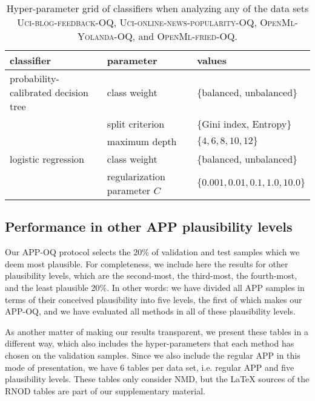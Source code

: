 \documentclass[10pt,a4paper]{article}
\begin{document}
\begin{table}
  \centering
  \caption{Hyper-parameter grid of classifiers when analyzing any of the data sets \textsc{Uci-blog-feedback-OQ}, \textsc{Uci-online-news-popularity-OQ}, \textsc{OpenMl-Yolanda-OQ}, and \textsc{OpenMl-fried-OQ}.}
  \label{tab:hyperparameter-others}
  \footnotesize
  \begin{tabular}{lll}
    \toprule
    classifier & parameter & values \\
    \midrule
    probability-calibrated decision tree & class weight & \{balanced, unbalanced\} \\
    & split criterion & \{Gini index, Entropy\} \\
    & maximum depth & $\{4, 6, 8, 10, 12\}$ \\
    logistic regression & class weight & \{balanced, unbalanced\} \\
    & regularization parameter $C$ & $\{0.001, 0.01, 0.1, 1.0, 10.0\}$ \\
    \bottomrule
  \end{tabular}
\end{table}


\subsection{Performance in other APP plausibility levels}

\noindent Our APP-OQ protocol selects the 20\% of validation and test samples which we deem most plausible. For completeness, we include here the results for other plausibility levels, which are the second-most, the third-most, the fourth-most, and the least plausible 20\%. In other words: we have divided all APP samples in terms of their conceived plausibility into five levels, the first of which makes our APP-OQ, and we have evaluated all methods in all of these plausibility levels.

As another matter of making our results transparent, we present these tables in a different way, which also includes the hyper-parameters that each method has chosen on the validation samples. Since we also include the regular APP in this mode of presentation, we have 6 tables per data set, i.e. regular APP and five plausibility levels. These tables only consider NMD, but the LaTeX sources of the RNOD tables are part of our supplementary material.

\newcommand{\rankingtable}[2]{
  \begin{table}
    \centering
    \caption{#2}
    \scriptsize
    
  \end{table}
}
\end{document}
